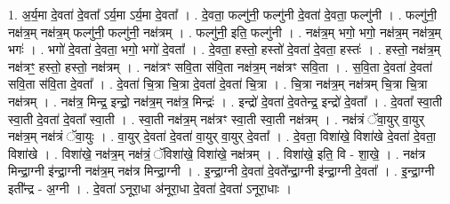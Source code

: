 \documentclass[17pt]{extarticle}
\begin{document}
1. अ॒र्य॒मा दे॒वता॑ दे॒वता᳚ ऽर्य॒मा ऽर्य॒मा दे॒वता᳚ । . दे॒वता॒ फल्गु॑नी॒ फल्गु॑नी दे॒वता॑ दे॒वता॒ फल्गु॑नी । . फल्गु॑नी॒ नक्ष॑त्र॒म् नक्ष॑त्र॒म् फल्गु॑नी॒ फल्गु॑नी॒ नक्ष॑त्रम् । . फल्गु॑नी॒ इति॒ फल्गु॑नी । . नक्ष॑त्र॒म् भगो॒ भगो॒ नक्ष॑त्र॒म् नक्ष॑त्र॒म् भगः॑ । . भगो॑ दे॒वता॑ दे॒वता॒ भगो॒ भगो॑ दे॒वता᳚ । . दे॒वता॒ हस्तो॒ हस्तो॑ दे॒वता॑ दे॒वता॒ हस्तः॑ । . हस्तो॒ नक्ष॑त्र॒म् नक्ष॑त्रꣳ॒॒ हस्तो॒ हस्तो॒ नक्ष॑त्रम् । . नक्ष॑त्रꣳ सवि॒ता स॑वि॒ता नक्ष॑त्र॒म् नक्ष॑त्रꣳ सवि॒ता । . स॒वि॒ता दे॒वता॑ दे॒वता॑ सवि॒ता स॑वि॒ता दे॒वता᳚ । . दे॒वता॑ चि॒त्रा चि॒त्रा दे॒वता॑ दे॒वता॑ चि॒त्रा । . चि॒त्रा नक्ष॑त्र॒म् नक्ष॑त्रम् चि॒त्रा चि॒त्रा नक्ष॑त्रम् । . नक्ष॑त्र॒ मिन्द्र॒ इन्द्रो॒ नक्ष॑त्र॒म् नक्ष॑त्र॒ मिन्द्रः॑ । . इन्द्रो॑ दे॒वता॑ दे॒वतेन्द्र॒ इन्द्रो॑ दे॒वता᳚ । . दे॒वता᳚ स्वा॒ती स्वा॒ती दे॒वता॑ दे॒वता᳚ स्वा॒ती । . स्वा॒ती नक्ष॑त्र॒म् नक्ष॑त्रꣳ स्वा॒ती स्वा॒ती नक्ष॑त्रम् । . नक्ष॑त्रं ॅवा॒युर् वा॒युर् नक्ष॑त्र॒म् नक्ष॑त्रं ॅवा॒युः । . वा॒युर् दे॒वता॑ दे॒वता॑ वा॒युर् वा॒युर् दे॒वता᳚ । . दे॒वता॒ विशा॑खे॒ विशा॑खे दे॒वता॑ दे॒वता॒ विशा॑खे । . विशा॑खे॒ नक्ष॑त्र॒म् नक्ष॑त्रं॒ ॅविशा॑खे॒ विशा॑खे॒ नक्ष॑त्रम् । . विशा॑खे॒ इति॒ वि - शा॒खे॒ । . नक्ष॑त्र मिन्द्रा॒ग्नी इ॑न्द्रा॒ग्नी नक्ष॑त्र॒म् नक्ष॑त्र मिन्द्रा॒ग्नी । . इ॒न्द्रा॒ग्नी दे॒वता॑ दे॒वते᳚न्द्रा॒ग्नी इ॑न्द्रा॒ग्नी दे॒वता᳚ । . इ॒न्द्रा॒ग्नी इती᳚न्द्र - अ॒ग्नी । . दे॒वता॑ ऽनूरा॒धा अ॑नूरा॒धा दे॒वता॑ दे॒वता॑ ऽनूरा॒धाः । \newline
\end{document}
